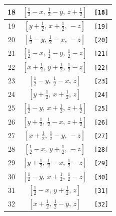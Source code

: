 \documentclass[fleqn,8pt]{jsarticle}
\begin{document}
\begin{longtable}{ccc}
18 & $\left[ \frac{1}{2} - x,\, \frac{1}{2} - y,\, z + \frac{1}{2} \right]$ & {\tt [18]} \\ \hline
19 & $\left[ y + \frac{1}{2},\, x + \frac{1}{2},\, - z \right]$ & {\tt [19]} \\ \hline
20 & $\left[ \frac{1}{2} - y,\, \frac{1}{2} - x,\, - z \right]$ & {\tt [20]} \\ \hline
21 & $\left[ \frac{1}{2} - x,\, \frac{1}{2} - y,\, \frac{1}{2} - z \right]$ & {\tt [21]} \\ \hline
22 & $\left[ x + \frac{1}{2},\, y + \frac{1}{2},\, \frac{1}{2} - z \right]$ & {\tt [22]} \\ \hline
23 & $\left[ \frac{1}{2} - y,\, \frac{1}{2} - x,\, z \right]$ & {\tt [23]} \\ \hline
24 & $\left[ y + \frac{1}{2},\, x + \frac{1}{2},\, z \right]$ & {\tt [24]} \\ \hline
25 & $\left[ \frac{1}{2} - y,\, x + \frac{1}{2},\, z + \frac{1}{2} \right]$ & {\tt [25]} \\ \hline
26 & $\left[ y + \frac{1}{2},\, \frac{1}{2} - x,\, z + \frac{1}{2} \right]$ & {\tt [26]} \\ \hline
27 & $\left[ x + \frac{1}{2},\, \frac{1}{2} - y,\, - z \right]$ & {\tt [27]} \\ \hline
28 & $\left[ \frac{1}{2} - x,\, y + \frac{1}{2},\, - z \right]$ & {\tt [28]} \\ \hline
29 & $\left[ y + \frac{1}{2},\, \frac{1}{2} - x,\, \frac{1}{2} - z \right]$ & {\tt [29]} \\ \hline
30 & $\left[ \frac{1}{2} - y,\, x + \frac{1}{2},\, \frac{1}{2} - z \right]$ & {\tt [30]} \\ \hline
31 & $\left[ \frac{1}{2} - x,\, y + \frac{1}{2},\, z \right]$ & {\tt [31]} \\ \hline
32 & $\left[ x + \frac{1}{2},\, \frac{1}{2} - y,\, z \right]$ & {\tt [32]} \\
\end{longtable}
\end{document}
